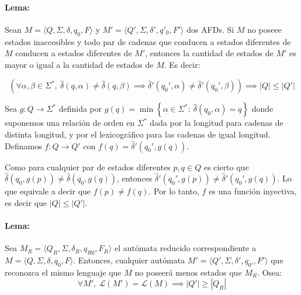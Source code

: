 \paragraph{Lema:} Sean \(M=\langle Q, \Sigma, \delta, q_0, F\rangle\) y \(M'=\langle Q', \Sigma, \delta', q'_0, F'\rangle\) dos AFDs. Si \(M\) no poseee estados inaccesibles y todo par de cadenas que conducen a estados diferentes de \(M\) conducen a estados diferentes de \(M'\), entonces la cantidad de estados de \(M'\) es mayor o igual a la cantidad de estados de \(M\). Es decir:

\[
  \left(
  \forall\alpha,\beta\in\Sigma^*,~\hat\delta(q, \alpha) \neq \hat\delta(q, \beta) \implies \hat\delta'(q_0', \alpha) \neq \hat\delta'(q_0', \beta)
  \right) \implies |Q|\leq |Q'|
\]

\begin{demo}[\textwidth]
  Sea \(g:Q\to\Sigma^*\) definida por \(g(q) = \min\left\{\alpha\in\Sigma^*:~\hat\delta(q_0,\alpha) = q\right\}\) donde suponemos una relación de orden en \(\Sigma^*\) dada por la longitud para cadenas de distinta longitud, y por el lexicográfico para las cadenas de igual longitud. Definamos \(f: Q\to Q'\) con \(f(q)=\hat\delta'(q_0', g(q))\).

  Como para cualquier par de estados diferentes \(p,q\in Q\) es cierto que \(\hat\delta(q_0, g(p))\neq\hat\delta(q_0, g(q))\), entonces \(\hat\delta'(q_0', g(p))\neq\hat\delta'(q_0', g(q))\). Lo que equivale a decir que \(f(p)\neq f(q)\). Por lo tanto, \(f\) es una función inyectiva, es decir que \(|Q|\leq |Q'|\).
\end{demo}

\paragraph{Lema:} Sea \(M_R = \langle Q_R, \Sigma, \delta_R, q_{R0}, F_R\rangle\) el autómata reducido correspondiente a \(M = \langle Q, \Sigma, \delta, q_0, F\rangle\). Entonces, cualquier autómata \(M' = \langle Q', \Sigma, \delta', q_{0'}, F'\rangle\) que reconozca el mismo lenguaje que \(M\) no poseerá menos estados que \(M_R\). Osea:
\[
  \forall M',~\mathcal{L} (M') = \mathcal{L} (M) \implies |Q'| \geq |Q_R|
\]

